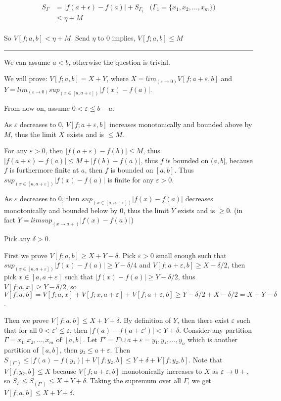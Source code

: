 \documentclass{article}
\begin{document}
\begin{align*}
    S_\Gamma
    &= |f(a + \epsilon) - f(a)| + S_{\Gamma_1} &\text{($\Gamma_1 = \{x_1, x_2, ..., x_m \}$)} \\
    &\leq \eta + M \\ 
\end{align*}

So $V[f; a, b] < \eta + M$. Send $\eta$ to $0$ implies, $V[f; a, b] \leq M$




\hrule
\fi


\typstmathinputenable{\$}

We can assume $a<b$, otherwise the question is trivial.

We will prove: $V[f; a, b] = X+Y$, where $X=lim_(ε → 0) V[f; a+ε, b]$ and $Y=lim_(ε → 0) sup_(x ∈[a, a+ε]) |f(x)-f(a)|$.

From now on, assume $0<ε ≤ b-a$.

As $ε$ decreases to $0$, $V[f; a+ε, b]$ increases monotonically and bounded above by $M$, thus the limit $X$ exists and is $≤ M$.

For any $ε>0$, then $|f(a+ε)-f(b)|≤ M$, thus $|f(a+ε)-f(a)|≤ M+|f(b)-f(a)|$, thus $f$ is bounded on $(a, b]$, because $f$ is furthermore finite at $a$, then $f$ is bounded on $[a, b]$. Thus $sup_(x ∈[a, a+ε]) |f(x)-f(a)|$ is finite for any $ε>0$.

As $ε$ decreases to $0$, then $sup_(x ∈[a, a+ε]) |f(x)-f(a)|$ decreases monotonically and bounded below by $0$, thus the limit $Y$ exists and is $≥ 0$. (in fact $Y=limsup_(x → a+) |f(x)-f(a)|$)

Pick any $δ>0$.

First we prove $V[f; a, b] ≥ X+Y - δ$. Pick $ε>0$ small enough such that 
$sup_(x ∈[a, a+ε]) |f(x)-f(a)| ≥ Y-δ/4$ and $V[f; a+ε, b]≥ X-δ/2$,
then pick $x ∈[a, a+ε]$ such that $|f(x)-f(a)|≥ Y-δ/2$,
thus $V[f; a, x] ≥ Y-δ/2$, so $V[f; a, b]=V[f; a, x]+V[f; x, a+ε]+V[f; a+ε,b] ≥ Y-δ/2 + X-δ/2 = X+Y-δ$.

Then we prove $V[f; a, b] ≤ X+Y+δ$.
By definition of $Y$, then there exist $ε$ such that for all $0<ε'≤ε$, then $|f(a)-f(a+ε')|<Y+δ$.
Consider any partition $Γ={x₁, x₂, …, x_m}$ of $[a, b]$.
Let $Γ'=Γ ∪ {a+ε} = {y₁, y₂, …, y_n}$ which is another partition of $[a, b]$, then $y₂ ≤ a+ε$.
Then $S_(Γ') ≤ |f(a)-f(y₂)| + V[f; y₂, b] ≤ Y+δ + V[f; y₂, b]$. Note that $V[f; y₂, b] ≤ X$ because $V[f; a+ε, b]$ monotonically increases to $X$ as $ε → 0+$, so $S_Γ ≤ S_(Γ') ≤ X+Y+δ$. Taking the supremum over all $Γ$, we get $V[f; a, b] ≤ X+Y+δ$.
\end{document}
